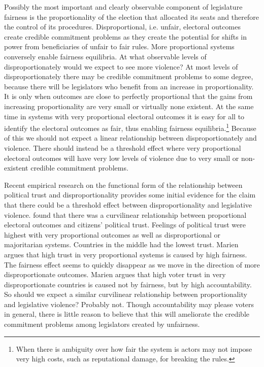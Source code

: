 \documentclass[a4paper]{article}\usepackage[]{graphicx}\usepackage[]{color}
\begin{document}
Possibly the most important and clearly observable component of legislature fairness is the proportionality of the election that allocated its seats and therefore the control of its procedures. Disproportional, i.e. unfair, electoral outcomes create credible commitment problems as they create the potential for shifts in power from beneficiaries of unfair to fair rules. More proportional systems conversely enable fairness equilibria. At what observable levels of disproportionately would we expect to see more violence? At most levels of disproportionately there may be credible commitment problems to some degree, because there will be legislators who benefit from an increase in proportionality. It is only when outcomes are close to perfectly proportional that the gains from increasing proportionality are very small or virtually none existent. At the same time in systems with very proportional electoral outcomes it is easy for all to identify the electoral outcomes as fair, thus enabling fairness equilibria.\footnote{When there is ambiguity over how fair the system is actors may not impose very high costs, such as reputational damage, for breaking the rules.} Because of this we should not expect a linear relationship between disproportionately and violence. There should instead be a threshold effect where very proportional electoral outcomes will have very low levels of violence due to very small or non-existent credible commitment problems.

Recent empirical research on the functional form of the relationship between political trust and disproportionality provides some initial evidence for the claim that there could be a threshold effect between disproportionality and legislative violence. \cite{Marien2011} found that there was a curvilinear relationship between proportional electoral outcomes and citizens' political trust. Feelings of political trust were highest with very proportional outcomes as well as disproportional or majoritarian systems. Countries in the middle had the lowest trust. Marien argues that high trust in very proportional systems is caused by high fairness. The fairness effect seems to quickly disappear as we move in the direction of more disproportionate outcomes. Marien argues that high voter trust in very disproportionate countries is caused not by fairness, but by high accountability. So should we expect a similar curvilinear relationship between proportionality and legislative violence? Probably not. Though accountability may please voters in general, there is little reason to believe that this will ameliorate the credible commitment problems among legislators created by unfairness.
\end{document}
